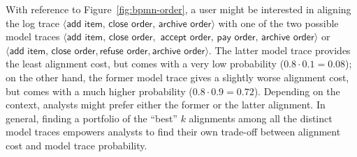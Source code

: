 With reference to Figure~\ref{fig:bpmn-order}, a user might be interested in aligning the log trace $\langle \textsf{add item},\,\textsf{close order},\,\textsf{archive order}\rangle$ with one of the two possible model traces $\langle \textsf{add item},\,\textsf{close order},$ $\textsf{accept order},\,\textsf{pay order},\,\textsf{archive order}\rangle$ or $\langle\textsf{add item},\,\textsf{close order}, \textsf{refuse order}, \textsf{archive order}\rangle$. The latter model trace provides the least alignment cost, but comes with a very low probability ($0.8 \cdot 0.1 = 0.08$); on the other hand, the former model trace gives a slightly worse alignment cost, but comes with a much higher probability ($0.8 \cdot 0.9 = 0.72$). Depending on the context, analysts might prefer either the former or the latter alignment. In general, finding a portfolio of the ``best'' $k$ alignments among all the distinct model traces empowers analysts to find their own trade-off between alignment cost and model trace probability.


